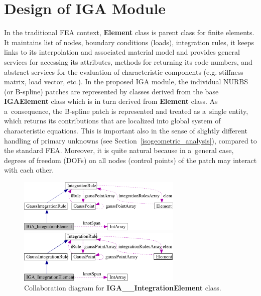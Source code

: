 \documentclass[a4paper]{article}
\newcommand{\class}[1]{{\bf #1}}
\begin{document}
\section{Design of IGA Module}
\label{iga_module}

In the traditional FEA context, \class{Element} class is parent
class for finite elements. It maintains list of nodes, boundary
conditions (loads), integration rules, it keeps links to its
interpolation and associated material model and provides general
services for accessing its attributes, methods for returning its code
numbers, and abstract services for the evaluation of characteristic
components (e.g. stiffness matrix, load vector, etc.). In the proposed
IGA module, the individual NURBS (or B-spline)
patches are represented by classes derived from the base
\class{IGAElement} class which is in turn derived from \class{Element}
class. As a~consequence, the B-spline patch is represented and treated as
a~single entity, which returns its contributions that are localized into
global system of characteristic equations. This is important also in the
sense of slightly different handling of primary unknowns (see
Section~\ref{isogeometric_analysis}), compared to the standard FEA.
Moreover, it is quite natural because in a~general case, degrees of
freedom (DOFs) on all nodes (control points) of the patch may interact
with each other.

\begin{figure}[b!]
\begin{center}
\ifpdf
\centerline{\includegraphics[width=0.7\textwidth]{class_IGA__IntegrationElement_mod.pdf}}
\else
\centerline{\includegraphics[width=0.7\textwidth]{class_IGA__IntegrationElement_mod.eps}}
\fi
\caption{Collaboration diagram for \class{IGA\_\_IntegrationElement} class.}
\label{IGA__IntegrationElement}
\end{center}
\vspace{-5mm}
\end{figure}
\end{document}
